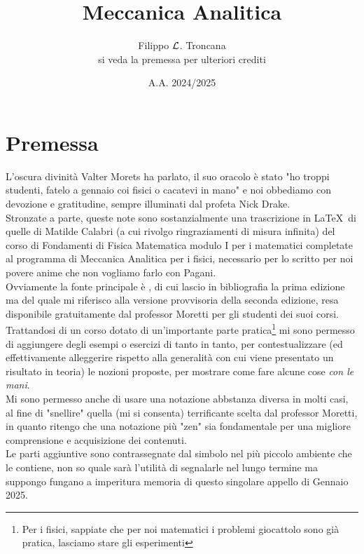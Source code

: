 \documentclass[annatarbolditalic, openany]{book}
\begin{document}
\title{Meccanica Analitica}
\author{Filippo $\mathcal{L}$. Troncana\\\small{si veda la premessa per ulteriori crediti}}
\date{A.A. 2024/2025}

\maketitle

\tableofcontents

\chapter*{Premessa}

L'oscura divinità Valter Morets ha parlato, il suo oracolo è stato "ho troppi studenti, fatelo a gennaio coi fisici o cacatevi in mano" e noi obbediamo con devozione e gratitudine, sempre illuminati dal profeta Nick Drake.\\
Stronzate a parte, queste note sono sostanzialmente una trascrizione in \LaTeX\ di quelle di Matilde Calabri (a cui rivolgo ringraziamenti di misura infinita) del corso di Fondamenti di Fisica Matematica modulo I per i matematici completate al programma di Meccanica Analitica per i fisici, necessario per lo scritto per noi povere anime che non vogliamo farlo con Pagani.\\
Ovviamente la fonte principale è \cite{moretti2020}, di cui lascio in bibliografia la prima edizione ma del quale mi riferisco alla versione provvisoria della seconda edizione, resa disponibile gratuitamente dal professor Moretti per gli studenti dei suoi corsi.\\
Trattandosi di un corso dotato di un'importante parte pratica\footnote{Per i fisici, sappiate che per noi matematici i problemi giocattolo sono già pratica, lasciamo stare gli esperimenti} mi sono permesso di aggiungere degli esempi o esercizi di tanto in tanto, per contestualizzare (ed effettivamente alleggerire rispetto alla generalità con cui viene presentato un risultato in teoria) le nozioni proposte, per mostrare come fare alcune cose \textit{con le mani}.\\
Mi sono permesso anche di usare una notazione abbstanza diversa in molti casi, al fine di "snellire" quella (mi si consenta) terrificante scelta dal professor Moretti, in quanto ritengo che una notazione più "zen" sia fondamentale per una migliore comprensione e acquisizione dei contenuti.\\
Le parti aggiuntive sono contrassegnate dal simbolo \Nick nel più piccolo ambiente che le contiene, non so quale sarà l'utilità di segnalarle nel lungo termine ma suppongo fungano a imperitura memoria di questo singolare appello di Gennaio 2025.
\end{document}
